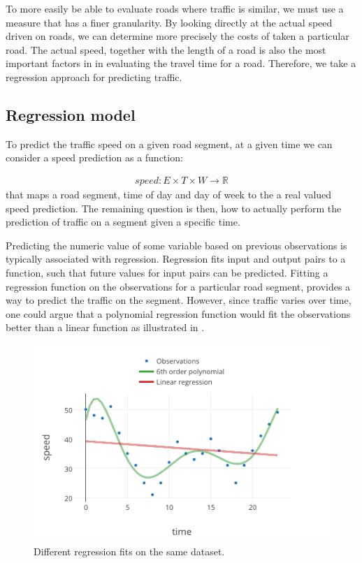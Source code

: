 To more easily be able to evaluate roads where traffic is similar, we must use a measure that has a finer granularity. By looking directly at the actual speed driven on roads, we can determine more precisely the costs of taken a particular road. The actual speed, together with the length of a road is also the most important factors in in evaluating the travel time for a road. Therefore, we take a regression approach for predicting traffic.
\subsection{Regression model}\label{patterns:regression-model}
To predict the traffic speed on a given road segment, at a given time we can consider a speed prediction as a function:

\begin{align}\label{eq:speed}
speed: E \times T \times W \rightarrow \mathbb{R}
\end{align}
that maps a road segment, time of day and day of week to the a real valued speed prediction. The remaining question is then, how to actually perform the prediction of traffic on a segment given a specific time. \par
Predicting the numeric value of some variable based on previous observations is typically associated with regression. Regression fits input and output pairs to a function, such that future values for input pairs can be predicted. Fitting a regression function on the observations for a particular road segment, provides a way to predict the traffic on the segment. However, since traffic varies over time, one could argue that a polynomial regression function would fit the observations better than a linear function as illustrated in .
\begin{figure}
\includegraphics[width=\textwidth]{figures/compare-regression.pdf}
\caption{Different regression fits on the same dataset.}
\label{fig:compare-regression}
\end{figure}
